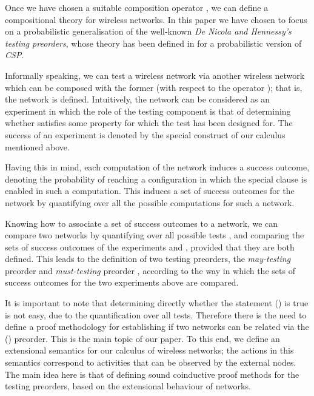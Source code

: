 \documentclass{LMCS}
\begin{document}
Once we have chosen a suitable composition operator , 
we can define a compositional theory for wireless networks. 
In this paper we have chosen to focus on a probabilistic generalisation 
of the well-known \emph{De Nicola and Hennessy's testing preorders}, 
whose theory has been defined in \cite{DGHM09full} for a probabilistic 
version of \emph{CSP}.

Informally speaking, we can test a wireless network  via 
another wireless network  which can be composed 
 with the former (with respect to the operator ); 
that is, the network  is 
defined. Intuitively, the network 
 can be considered as an experiment 
in which the role of the testing component  is that of 
determining whether  satisfies some property for which 
the test has been designed for. The success of an experiment is 
denoted by the special construct of our calculus  mentioned above. 

Having this in mind, each computation of the network 
 induces a success outcome, denoting the probability 
of reaching a configuration in which the special clause  is enabled 
in such a computation. This induces a set of success outcomes for the network 
 by quantifying over all the possible computations for such a network. 

Knowing how to associate a set of success outcomes to a network, we can compare two 
networks  by quantifying over all possible tests , and comparing 
the sets of success outcomes of the experiments  and 
, provided that they are both defined. This leads to 
the definition of two testing preorders, the \emph{may-testing} preorder  
and \emph{must-testing} preorder , according to the way in which the sets 
of success outcomes for the two experiments above are compared. 

It is important to note that determining directly whether the statement  
 () 
is true is not easy, due to the quantification over all tests. 
Therefore there is the need to define a proof methodology for establishing 
if two networks can be related via the  () preorder. 
This is the main topic of our paper. 
To this end, we define an extensional 
semantics for our calculus of wireless networks; the actions in 
this semantics correspond to activities that can be observed 
by the external nodes. The main idea here is that of defining 
sound coinductive proof methods for the testing preorders, 
based on the extensional behaviour of networks. 
\end{document}
